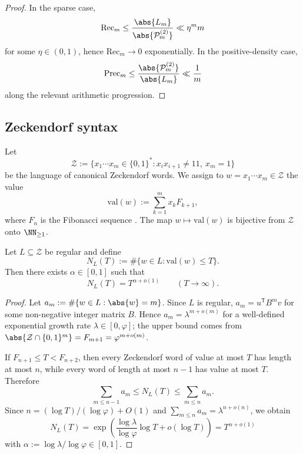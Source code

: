 \begin{proof}
  In the sparse case,
  \[
    \mathrm{Rec}_m
    \le \frac{\abs{L_m}}{\abs{\mathcal P_m^{(2)}}}
    \ll \eta^m m
  \]
  for some $\eta\in(0,1)$, hence $\mathrm{Rec}_m\to 0$
  exponentially. In the positive-density case,
  \[
    \mathrm{Prec}_m
    \le \frac{\abs{\mathcal P_m^{(2)}}}{\abs{L_m}}
    \ll \frac{1}{m}
  \]
  along the relevant arithmetic progression.
\end{proof}

\subsection{Zeckendorf syntax}

Let
\[
  \mathcal Z
  :=\{x_1\cdots x_m\in\{0,1\}^\ast:
      x_ix_{i+1}\neq 11,\ x_m=1\}
\]
be the language of canonical Zeckendorf words. We assign to
$w=x_1\cdots x_m\in\mathcal Z$ the value
\[
  \mathrm{val}(w):=\sum_{k=1}^m x_kF_{k+1},
\]
where $F_n$ is the Fibonacci sequence \cite{Zeckendorf1972}. The map
$w\mapsto \mathrm{val}(w)$ is bijective from $\mathcal Z$ onto
$\NN_{\ge 1}$.

\begin{theorem}
  \label{thm:zeckendorf-regular-powerlaw}
  Let $L\subseteq\mathcal Z$ be regular and define
  \[
    N_L(T):=\#\{w\in L:\mathrm{val}(w)\le T\}.
  \]
  Then there exists $\alpha\in[0,1]$ such that
  \[
    N_L(T)=T^{\alpha+o(1)}
    \qquad (T\to\infty).
  \]
\end{theorem}

\begin{proof}
  Let $a_m:=\#\{w\in L:\abs{w}=m\}$. Since $L$ is regular,
  $a_m=u^{\mathsf T}B^m v$ for some non-negative integer matrix $B$.
  Hence $a_m=\lambda^{m+o(m)}$ for a well-defined exponential growth
  rate $\lambda\in[0,\varphi]$; the upper bound comes from
  $\abs{\mathcal Z\cap\{0,1\}^m}=F_{m+1}=\varphi^{m+o(m)}$.

  If $F_{n+1}\le T<F_{n+2}$, then every Zeckendorf word of value at
  most $T$ has length at most $n$, while every word of length at most
  $n-1$ has value at most $T$. Therefore
  \[
    \sum_{m\le n-1}a_m\le N_L(T)\le \sum_{m\le n}a_m.
  \]
  Since $n=(\log T)/(\log\varphi)+O(1)$ and
  $\sum_{m\le n}a_m=\lambda^{n+o(n)}$, we obtain
  \[
    N_L(T)
    =\exp\!\left(\frac{\log\lambda}{\log\varphi}\log T+o(\log T)\right)
    =T^{\alpha+o(1)}
  \]
  with $\alpha:=\log\lambda/\log\varphi\in[0,1]$.
\end{proof}

